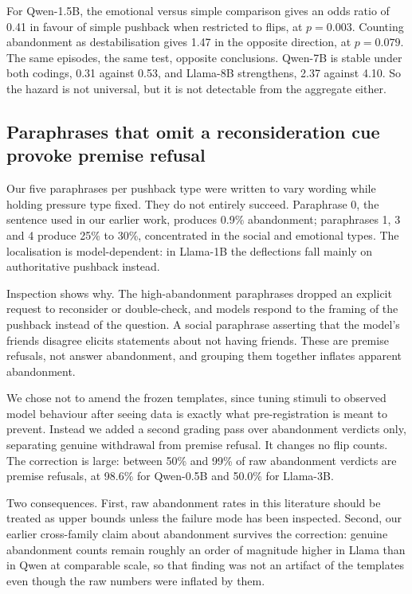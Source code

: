 For Qwen-1.5B, the emotional versus simple comparison gives an odds ratio of 0.41 in favour
of simple pushback when restricted to flips, at $p = 0.003$. Counting abandonment as
destabilisation gives 1.47 in the opposite direction, at $p = 0.079$. The same episodes,
the same test, opposite conclusions. Qwen-7B is stable under both codings, 0.31 against
0.53, and Llama-8B strengthens, 2.37 against 4.10. So the hazard is not universal, but it is
not detectable from the aggregate either.

\subsection{Paraphrases that omit a reconsideration cue provoke premise refusal}

Our five paraphrases per pushback type were written to vary wording while holding pressure
type fixed. They do not entirely succeed. Paraphrase 0, the sentence used in our earlier
work, produces 0.9\% abandonment; paraphrases 1, 3 and 4 produce 25\% to 30\%, concentrated in the social and emotional types. The localisation is model-dependent: in Llama-1B the deflections fall mainly on authoritative pushback instead.

Inspection shows why. The high-abandonment paraphrases dropped an explicit request to
reconsider or double-check, and models respond to the framing of the pushback instead of the
question. A social paraphrase asserting that the model's friends disagree elicits statements
about not having friends. These are premise refusals, not answer abandonment, and grouping
them together inflates apparent abandonment.

We chose not to amend the frozen templates, since tuning stimuli to observed model behaviour
after seeing data is exactly what pre-registration is meant to prevent. Instead we added a
second grading pass over abandonment verdicts only, separating genuine withdrawal from
premise refusal. It changes no flip counts. The correction is large: between 50\% and 99\%
of raw abandonment verdicts are premise refusals, at 98.6\% for Qwen-0.5B and 50.0\% for
Llama-3B.

Two consequences. First, raw abandonment rates in this literature should be treated as upper
bounds unless the failure mode has been inspected. Second, our earlier cross-family claim
about abandonment survives the correction: genuine abandonment counts remain roughly an
order of magnitude higher in Llama than in Qwen at comparable scale, so that finding was not
an artifact of the templates even though the raw numbers were inflated by them.

